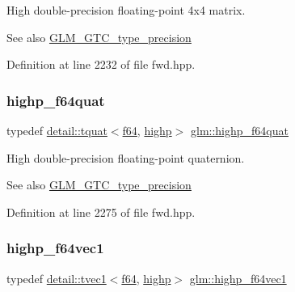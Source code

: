High double-\/precision floating-\/point 4x4 matrix. \begin{DoxySeeAlso}{See also}
\hyperlink{group__gtc__type__precision}{G\+L\+M\+\_\+\+G\+T\+C\+\_\+type\+\_\+precision} 
\end{DoxySeeAlso}


Definition at line 2232 of file fwd.\+hpp.

\mbox{\label{group__gtc__type__precision_ga9372e8b60f401fd94aba637b3ed17cfc}} 
\subsubsection{\texorpdfstring{highp\+\_\+f64quat}{highp\_f64quat}}
{\footnotesize\ttfamily typedef \hyperlink{structglm_1_1detail_1_1tquat}{detail\+::tquat}$<$\hyperlink{group__gtc__type__precision_ga2bba392e555124b36cde6abba349bab3}{f64}, \hyperlink{namespaceglm_a0f04f086094c747d227af4425893f545ac6f7eab42eacbb10d59a58e95e362074}{highp}$>$ \hyperlink{group__gtc__type__precision_ga9372e8b60f401fd94aba637b3ed17cfc}{glm\+::highp\+\_\+f64quat}}

High double-\/precision floating-\/point quaternion. \begin{DoxySeeAlso}{See also}
\hyperlink{group__gtc__type__precision}{G\+L\+M\+\_\+\+G\+T\+C\+\_\+type\+\_\+precision} 
\end{DoxySeeAlso}


Definition at line 2275 of file fwd.\+hpp.

\mbox{\label{group__gtc__type__precision_ga1054b4e4da2b907b35e1806bd6fbaef1}} 
\subsubsection{\texorpdfstring{highp\+\_\+f64vec1}{highp\_f64vec1}}
{\footnotesize\ttfamily typedef \hyperlink{structglm_1_1detail_1_1tvec1}{detail\+::tvec1}$<$\hyperlink{group__gtc__type__precision_ga2bba392e555124b36cde6abba349bab3}{f64}, \hyperlink{namespaceglm_a0f04f086094c747d227af4425893f545ac6f7eab42eacbb10d59a58e95e362074}{highp}$>$ \hyperlink{group__gtc__type__precision_ga1054b4e4da2b907b35e1806bd6fbaef1}{glm\+::highp\+\_\+f64vec1}}

